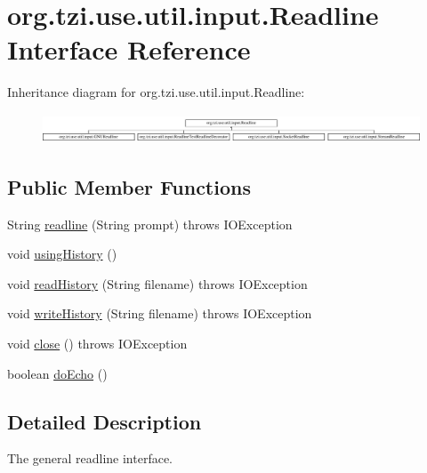\hypertarget{interfaceorg_1_1tzi_1_1use_1_1util_1_1input_1_1_readline}{\section{org.\-tzi.\-use.\-util.\-input.\-Readline Interface Reference}
\label{interfaceorg_1_1tzi_1_1use_1_1util_1_1input_1_1_readline}
}
Inheritance diagram for org.\-tzi.\-use.\-util.\-input.\-Readline\-:\begin{figure}[H]
\begin{center}
\leavevmode
\includegraphics[height=0.897436cm]{interfaceorg_1_1tzi_1_1use_1_1util_1_1input_1_1_readline}
\end{center}
\end{figure}
\subsection*{Public Member Functions}
\begin{DoxyCompactItemize}
\item 
String \hyperlink{interfaceorg_1_1tzi_1_1use_1_1util_1_1input_1_1_readline_afa2b0f3a094b518c6ae7bc95a24e52ac}{readline} (String prompt)  throws I\-O\-Exception
\item 
void \hyperlink{interfaceorg_1_1tzi_1_1use_1_1util_1_1input_1_1_readline_ab82cc5b433b657ddb10fcf4de8439eb5}{using\-History} ()
\item 
void \hyperlink{interfaceorg_1_1tzi_1_1use_1_1util_1_1input_1_1_readline_aa9cbd25c27eb8cee3ab4c46b15864ca5}{read\-History} (String filename)  throws I\-O\-Exception
\item 
void \hyperlink{interfaceorg_1_1tzi_1_1use_1_1util_1_1input_1_1_readline_adbdefac48fea8074c4294e564951a9cf}{write\-History} (String filename)  throws I\-O\-Exception
\item 
void \hyperlink{interfaceorg_1_1tzi_1_1use_1_1util_1_1input_1_1_readline_acef689c312cb817be8420063f89d0fc9}{close} ()  throws I\-O\-Exception
\item 
boolean \hyperlink{interfaceorg_1_1tzi_1_1use_1_1util_1_1input_1_1_readline_af7d105becc13e41d90554f2b99b30bd6}{do\-Echo} ()
\end{DoxyCompactItemize}


\subsection{Detailed Description}
The general readline interface.

